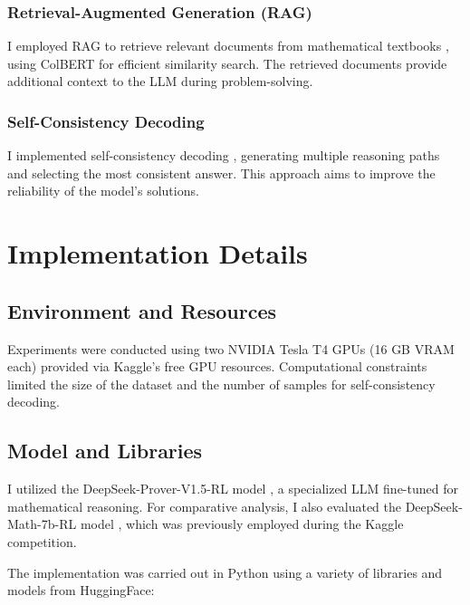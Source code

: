\documentclass[11pt,a4paper]{article}
\begin{document}
\subsubsection{Retrieval-Augmented Generation (RAG)}
I employed RAG to retrieve relevant documents from mathematical textbooks \cite{wentingzhao2023mathtextbooks}, using ColBERT \cite{khattab2020colbert} for efficient similarity search. The retrieved documents provide additional context to the LLM during problem-solving.

\subsubsection{Self-Consistency Decoding}
I implemented self-consistency decoding \cite{wang2023selfconsistencyimproveschainthought}, generating multiple reasoning paths and selecting the most consistent answer. This approach aims to improve the reliability of the model's solutions.

\section{Implementation Details}
\subsection{Environment and Resources}
Experiments were conducted using two NVIDIA Tesla T4 GPUs (16 GB VRAM each) provided via Kaggle's free GPU resources. Computational constraints limited the size of the dataset and the number of samples for self-consistency decoding.

\subsection{Model and Libraries}

I utilized the DeepSeek-Prover-V1.5-RL model \cite{xin2024deepseekproverv15harnessingproofassistant}, a specialized LLM fine-tuned for mathematical reasoning. For comparative analysis, I also evaluated the DeepSeek-Math-7b-RL model \cite{shao2024deepseekmathpushinglimitsmathematical}, which was previously employed during the Kaggle competition.

The implementation was carried out in Python using a variety of libraries and models from HuggingFace:
\end{document}
